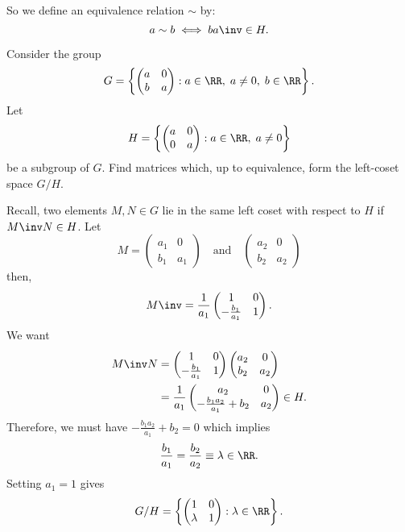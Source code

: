 \documentclass[12pt, a4paper]{article}
\begin{document}
So we define an equivalence relation \(\sim\) by:
\[a\sim b \iff ba\inv \in H.\]

\begin{mdexample}
    Consider the group 
    \[G = \left\{ \begin{pmatrix} a & 0 \\ b & a\end{pmatrix} : a \in \RR,\; a\neq 0, \; b \in \RR \right\} .\]
    Let 
    \[H = \left\{ \begin{pmatrix} a & 0 \\ 0 & a\end{pmatrix} : a \in \RR,\; a\neq 0 \right\}\]
    be a subgroup of \(G\). Find matrices which, up to equivalence, form the left-coset space \(G/H\).
    \begin{solution}
        Recall, two elements \(M,N \in G\) lie in the same left coset with respect to \(H\) if \(M\inv N \in H\). Let 
        \[M = \begin{pmatrix} a_1 & 0 \\ b_1 & a_1\end{pmatrix} \quad \text{and} \quad \begin{pmatrix} a_2 & 0 \\ b_2 & a_2\end{pmatrix}\]
        then, 
        \[M\inv = \frac{1}{a_1} \begin{pmatrix} 1 & 0 \\ -\frac{b_1}{a_1} & 1\end{pmatrix}.\]
        We want 
        \[\begin{aligned}
            M\inv N &= \begin{pmatrix} 1 & 0 \\ -\frac{b_1}{a_1} & 1\end{pmatrix}\begin{pmatrix} a_2 & 0 \\ b_2 & a_2\end{pmatrix} \\
            &= \frac{1}{a_1}\begin{pmatrix} a_2 & 0 \\ -\frac{b_1a_2}{a_1}+b_2 & a_2\end{pmatrix} \in H.
        \end{aligned}\]
        Therefore, we must have \(-\frac{b_1a_2}{a_1}+b_2=0\) which implies 
        \[\frac{b_1}{a_1} =\frac{b_2}{a_2} \equiv \lambda \in \RR.\]
        Setting \(a_1 =1\) gives
        \[G/H = \left\{ \begin{pmatrix} 1 & 0 \\ \lambda & 1\end{pmatrix} : \lambda \in \RR \right\}.\]
    \end{solution}
\end{mdexample}
\end{document}
